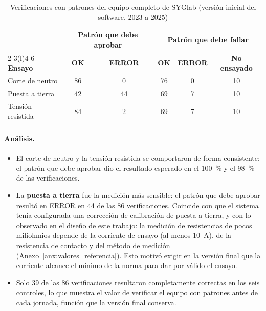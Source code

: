 \begin{table}[htbp]
\centering
\caption{Verificaciones con patrones del equipo completo de SYGlab (versión inicial
         del software, 2023 a 2025)}
\label{tab:verificaciones_fdl}
\renewcommand{\arraystretch}{1.25}
\small
\begin{tabular}{@{} l c c c c c @{}}
\toprule
& \multicolumn{2}{c}{\textbf{Patrón que debe aprobar}}
& \multicolumn{3}{c}{\textbf{Patrón que debe fallar}} \\
\cmidrule(lr){2-3}\cmidrule(l){4-6}
\textbf{Ensayo} & \textbf{OK} & \textbf{ERROR} & \textbf{OK} & \textbf{ERROR} &
\textbf{No ensayado} \\
\midrule
Corte de neutro    & 86 & 0  & 76 & 0 & 10 \\
Puesta a tierra    & 42 & 44 & 69 & 7 & 10 \\
Tensión resistida  & 84 & 2  & 69 & 7 & 10 \\
\bottomrule
\end{tabular}
\end{table}

\paragraph{Análisis.}
\begin{itemize}
    \item El corte de neutro y la tensión resistida se comportaron de forma
          consistente: el patrón que debe aprobar dio el resultado esperado en
          el \SI{100}{\percent} y el \SI{98}{\percent} de las verificaciones.
    \item La \textbf{puesta a tierra} fue la medición más sensible: el patrón que
          debe aprobar resultó en ERROR en 44 de las 86 verificaciones. Coincide
          con que el sistema tenía configurada una corrección de calibración de
          puesta a tierra, y con lo observado en el diseño de este trabajo: la
          medición de resistencias de pocos miliohmios depende de la corriente de
          ensayo (al menos \SI{10}{\ampere}), de la resistencia de contacto y del
          método de medición (Anexo~\ref{anx:valores_referencia}). Esto motivó
          exigir en la versión final que la corriente alcance el mínimo de la
          norma para dar por válido el ensayo.
    \item Solo 39 de las 86 verificaciones resultaron completamente correctas en
          los seis controles, lo que muestra el valor de verificar el equipo con
          patrones antes de cada jornada, función que la versión final conserva.
\end{itemize}

